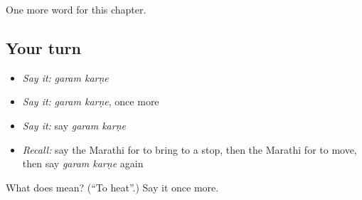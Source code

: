 \begin{grammarlens}[title={What you've built}]
One more word for this chapter.
\end{grammarlens}

\subsection*{Your turn}
\begin{itemize}
\raggedright
  \item \emph{Say it:} \emph{garam karṇe}
  \item \emph{Say it:} \emph{garam karṇe}, once more
  \item \emph{Say it:} say \emph{garam karṇe}
  \item \emph{Recall:} say the Marathi for to bring to a stop, then the Marathi for to move, then say \emph{garam karṇe} again
\end{itemize}

\begin{tcolorbox}[breakable,colback=teal!4,colframe=teal!35!black,title={Before you move on}]
What does   mean? (\textquotedblleft{}To heat\textquotedblright{}.) Say it once more.
\end{tcolorbox}
